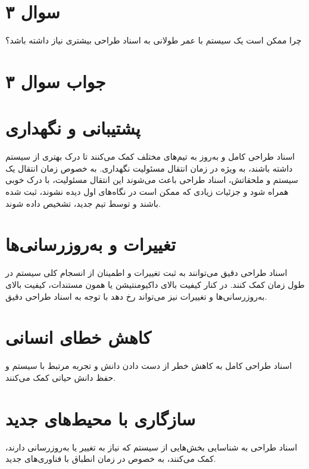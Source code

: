 \section*{سوال ۳}

چرا ممکن است یک سیستم با عمر طولانی به اسناد طراحی بیشتری نیاز داشته باشد؟

\section*{جواب سوال ۳}

\section*{پشتیبانی و نگهداری}
اسناد طراحی کامل و به‌روز به تیم‌های مختلف کمک می‌کنند تا درک بهتری از سیستم داشته باشند، به ویژه در زمان انتقال مسئولیت نگهداری. به خصوص زمان انتقال یک سیستم و ملحقاتش، اسناد طراحی باعث می‌شوند این انتقال مسئولیت، با درک خوبی همراه شود و جزئیات زیادی که ممکن است در نگاه‌های اول دیده نشوند، ثبت شده باشند و توسط تیم جدید، تشخیص داده شوند.

\section*{تغییرات و به‌روزرسانی‌ها}
اسناد طراحی دقیق می‌توانند به ثبت تغییرات و اطمینان از انسجام کلی سیستم در طول زمان کمک کنند. در کنار کیفیت بالای داکیومنتیشن یا همون مستندات، کیفیت بالای به‌روزرسانی‌ها و تغییرات نیز می‌تواند رخ دهد با توجه به اسناد طراحی دقیق.

\section*{کاهش خطای انسانی}
اسناد طراحی کامل به کاهش خطر از دست دادن دانش و تجربه مرتبط با سیستم و حفظ دانش حیاتی کمک می‌کنند.

\section*{سازگاری با محیط‌های جدید}
اسناد طراحی به شناسایی بخش‌هایی از سیستم که نیاز به تغییر یا به‌روزرسانی دارند، کمک می‌کنند، به خصوص در زمان انطباق با فناوری‌های جدید.